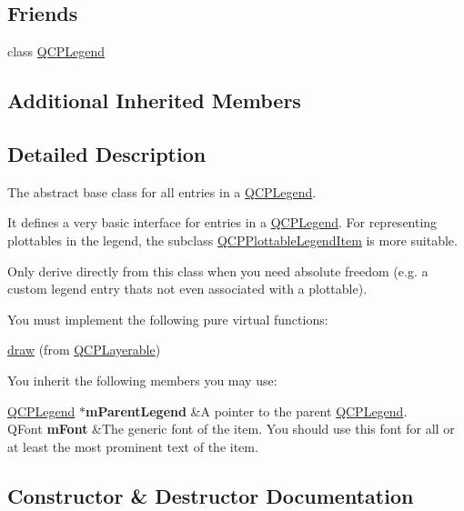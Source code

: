 \subsection*{Friends}
\begin{DoxyCompactItemize}
\item 
class \hyperlink{class_q_c_p_abstract_legend_item_a8429035e7adfbd7f05805a6530ad5e3b}{Q\+C\+P\+Legend}
\end{DoxyCompactItemize}
\subsection*{Additional Inherited Members}


\subsection{Detailed Description}
The abstract base class for all entries in a \hyperlink{class_q_c_p_legend}{Q\+C\+P\+Legend}. 

It defines a very basic interface for entries in a \hyperlink{class_q_c_p_legend}{Q\+C\+P\+Legend}. For representing plottables in the legend, the subclass \hyperlink{class_q_c_p_plottable_legend_item}{Q\+C\+P\+Plottable\+Legend\+Item} is more suitable.

Only derive directly from this class when you need absolute freedom (e.\+g. a custom legend entry that\textquotesingle{}s not even associated with a plottable).

You must implement the following pure virtual functions\+: \begin{DoxyItemize}
\item \hyperlink{class_q_c_p_abstract_legend_item_a97dedc084c672359710f16b31d046d1d}{draw} (from \hyperlink{class_q_c_p_layerable}{Q\+C\+P\+Layerable})\end{DoxyItemize}
You inherit the following members you may use\+: \begin{TabularC}{2}
\hline
\hyperlink{class_q_c_p_legend}{Q\+C\+P\+Legend} $\ast${\bfseries m\+Parent\+Legend}  &A pointer to the parent \hyperlink{class_q_c_p_legend}{Q\+C\+P\+Legend}. \\
Q\+Font {\bfseries m\+Font}  &The generic font of the item. You should use this font for all or at least the most prominent text of the item.  \\
\end{TabularC}


\subsection{Constructor \& Destructor Documentation}
\hypertarget{class_q_c_p_abstract_legend_item_afaff87610e8da0fa238ecf552872d774}{}
